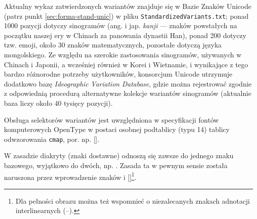 








{ Aktualny wykaz zatwierdzonych wariantów znajduje się w
  Bazie Znaków Unicode (patrz punkt \vref{sec:forma-stand-unic}) w
  pliku {\texttt{StandardizedVariants.txt}}; ponad 1000
  pozycji dotyczy sinogramów (ang. i jap. \textit{kanji} --- znaków
  powstałych na początku naszej ery w Chinach za panowania dynastii
  Han), ponad 200 dotyczy tzw. emoji, około 30 znaków matematycznych,
  pozostałe dotyczą języka mongolskiego. Ze względu na szerokie
  zastosowania sinogramów, używanych w Chinach i Japonii, a wcześniej
  również w Korei i Wietnamie, i wynikające z tego bardzo różnorodne
  potrzeby użytkowników, konsorcjum Unicode utrzymuje dodatkowo bazę
  \textit{Ideographic Variation Database}, gdzie można rejestrować
  zgodnie z odpowiednią procedurą alternatywne kolekcje wariantów
  sinogramów (aktualnie baza liczy około 40 tysięcy pozycji).

  Obsługa selektorów wariantów jest uwzględniona w specyfikacji fontów
  komputerowych OpenType w postaci osobnej podtablicy (typu 14)
  tablicy odwzorowania \texttt{cmap},
  por. np. [\cite{microsoft:_charac_glyph_index_mappin_table}].

}
W zasadzie diakryty (znaki dostawne) odnoszą się zawsze do jednego
znaku bazowego, wyjątkowo do dwóch, np.  . Zasada ta w pewnym sensie została naruszona przez
wprowadzenie znaków  i
[\cite{titlo2013}]\footnote{Dla pełności obrazu można też wspomnieć
  o niezalecanych znakach adnotacji interlinearnych
  (--).}.




